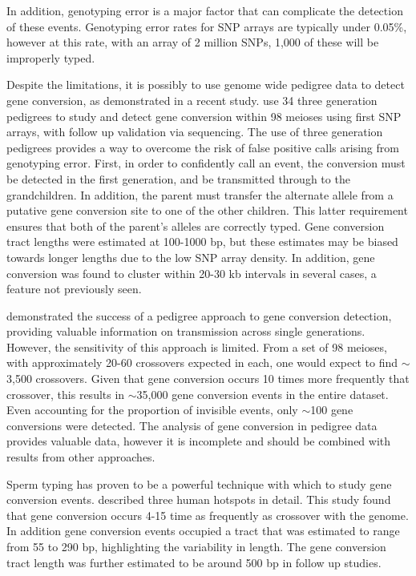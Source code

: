 In addition, genotyping error is a major factor that can complicate the detection of these events.
Genotyping error rates for SNP arrays are typically under 0.05\%\cite{Imai2010}, however at this rate, with an array of 2 million SNPs, 1,000 of these will be improperly typed.

Despite the limitations, it is possibly to use genome wide pedigree data to detect gene conversion, as demonstrated in a recent study.
\citet{Williams2015} use 34 three generation pedigrees to study and detect gene conversion within 98 meioses using first SNP arrays, with follow up validation via sequencing.
The use of three generation pedigrees provides a way to overcome the risk of false positive calls arising from genotyping error.
First, in order to confidently call an event, the conversion must be detected in the first generation, and be transmitted through to the grandchildren.
In addition, the parent must transfer the alternate allele from a putative gene conversion site to one of the other children.
This latter requirement ensures that both of the parent's alleles are correctly typed.
Gene conversion tract lengths were estimated at 100-1000 bp, but these estimates may be biased towards longer lengths due to the low SNP array density.
In addition, gene conversion was found to cluster within 20-30 kb intervals in several cases, a feature not previously seen.


\citet{Williams2015} demonstrated the success of a pedigree approach to gene conversion detection, providing valuable information on transmission across single generations.
However, the sensitivity of this approach is limited.
From a set of 98 meioses, with approximately 20-60 crossovers expected in each, one would expect to find $\sim$3,500 crossovers.
Given that gene conversion occurs 10 times more frequently that crossover\cite{Jeffreys2004,Baudat2007,Cole2012}, this results in $\sim$35,000 gene conversion events in the entire dataset.
Even accounting for the proportion of invisible events, only $\sim$100 gene conversions were detected.
The analysis of gene conversion in pedigree data provides valuable data, however it is incomplete and should be combined with results from other approaches.


Sperm typing has proven to be a powerful technique with which to study gene conversion events.
\citet{Jeffreys2004} described three human hotspots in detail.
This study found that gene conversion occurs 4-15 time as frequently as crossover with the genome.
In addition gene conversion events occupied a tract that was estimated to range from 55 to 290 bp, highlighting the variability in length.
The gene conversion tract length was further estimated to be around 500 bp\cite{Cole2012} in follow up studies.




